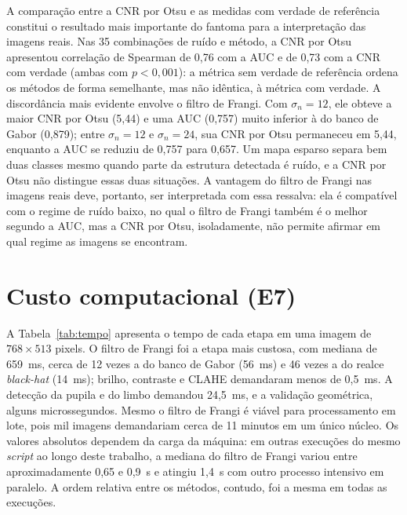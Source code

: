 \documentclass[12pt, oneside, a4paper, chapter=TITLE, section=TITLE,
               english, brazil]{abntex2}
\newcommand{\secao}[1]{\section[\texorpdfstring{\protect\MakeTextUppercase{#1}}{#1}]{#1}}
\newcommand{\bh}{\emph{black-hat}}
\begin{document}
A comparação entre a CNR por Otsu e as medidas com verdade de referência
constitui o resultado mais importante do fantoma para a interpretação das
imagens reais. Nas 35 combinações de ruído e método, a CNR por Otsu
apresentou correlação de Spearman de 0,76 com a AUC e de 0,73 com a CNR com
verdade (ambas com $p < 0{,}001$): a métrica sem verdade de referência ordena
os métodos de forma semelhante, mas não idêntica, à métrica com verdade. A
discordância mais evidente envolve o filtro de Frangi. Com $\sigma_n = 12$,
ele obteve a maior CNR por Otsu (5,44) e uma AUC (0,757) muito inferior à do
banco de Gabor (0,879); entre $\sigma_n = 12$ e $\sigma_n = 24$, sua CNR por
Otsu permaneceu em 5,44, enquanto a AUC se reduziu de 0,757 para 0,657. Um
mapa esparso separa bem duas classes mesmo quando parte da estrutura
detectada é ruído, e a CNR por Otsu não distingue essas duas situações. A
vantagem do filtro de Frangi nas imagens reais deve, portanto, ser
interpretada com essa ressalva: ela é compatível com o regime de ruído baixo,
no qual o filtro de Frangi também é o melhor segundo a AUC, mas a CNR por
Otsu, isoladamente, não permite afirmar em qual regime as imagens se
encontram.

\secao{Custo computacional (E7)}
\label{sec:res-custo}

A Tabela~\ref{tab:tempo} apresenta o tempo de cada etapa em uma imagem de
$768 \times 513$ pixels. O filtro de Frangi foi a etapa mais custosa, com
mediana de 659~ms, cerca de 12 vezes a do banco de Gabor (56~ms) e 46 vezes a
do realce \bh{} (14~ms); brilho, contraste e CLAHE demandaram menos de
0,5~ms. A detecção da pupila e do limbo demandou 24,5~ms, e a validação
geométrica, alguns microssegundos. Mesmo o filtro de Frangi é viável para
processamento em lote, pois mil imagens demandariam cerca de 11 minutos em um
único núcleo. Os valores absolutos dependem da carga da máquina: em outras
execuções do mesmo \emph{script} ao longo deste trabalho, a mediana do filtro
de Frangi variou entre aproximadamente 0,65 e 0,9~s e atingiu 1,4~s com outro
processo intensivo em paralelo. A ordem relativa entre os métodos, contudo,
foi a mesma em todas as execuções.

\begin{table}[htbp]
  \caption{Tempo de execução por etapa (E7)}
  \label{tab:tempo}
  \centering\footnotesize
  
\end{table}
\end{document}
